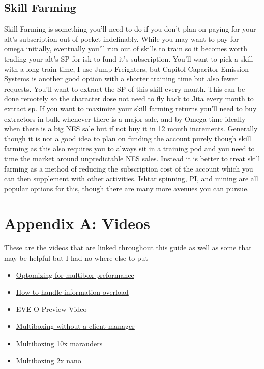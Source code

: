 \documentclass{article}
\begin{document}
\subsection{Skill Farming}
Skill Farming is something you'll need to do if you don't plan on paying for your alt's subscription out of pocket indefinably. While you may want to pay 
for omega initially, eventually you'll run out of skills to train so it becomes worth trading your alt's SP for isk to fund it's subscription. You'll want 
to pick a skill with a long train time, I use Jump Freighters, but Capitol Capacitor Emission Systems is another good option with a shorter training time 
but also fewer requests. You'll want to extract the SP of this skill every month. This can be done remotely so the character dose not need to fly back to 
Jita every month to extract sp. If you want to maximize your skill farming returns you'll need to buy extractors in bulk whenever there is a major sale, 
and by Omega time ideally when there is a big NES sale but if not buy it in 12 month increments. Generally though it is not a good idea to plan on funding
the account purely though skill farming as this also requires you to always sit in a training pod and you need to time the market around unpredictable NES
sales. Instead it is better to treat skill farming as a method of reducing the subscription cost of the account which you can then supplement with other
activities. Ishtar spinning, PI, and mining are all popular options for this, though there are many more avenues you can pursue.



\section*{Appendix A: Videos}
These are the videos that are linked throughout this guide as well as some that may be helpful but I had no where else to put
\begin{itemize}
  \item \href{https://www.youtube.com/watch?v=dKbQezW0ZwU}{Optomizing for multibox preformance}
  \item \href{https://www.youtube.com/watch?v=Lm4tVwSkBiE}{How to handle information overload}
  \item \href{https://www.youtube.com/watch?v=UpQpgcKSCS4}{EVE-O Preview Video}
  \item \href{https://www.youtube.com/watch?v=xpiYxq3mpD8}{Multiboxing without a client manager}
  \item \href{https://www.youtube.com/watch?v=iC8PwaFf8ck}{Multiboxing 10x marauders}
  \item \href{https://www.youtube.com/watch?v=p5WXd2IkaOc}{Multiboxing 2x nano}
\end{itemize}
\end{document}

